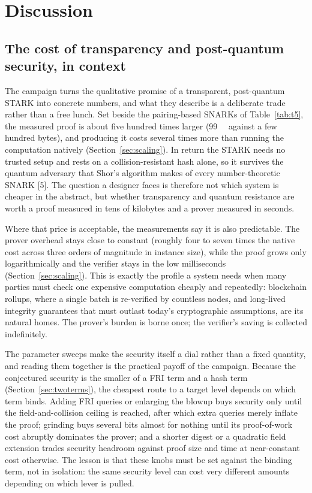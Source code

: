 \documentclass[11pt]{article}
\begin{document}
\section{Discussion}
\label{sec:discussion}

\subsection{The cost of transparency and post-quantum security, in context}
\label{sec:disc-interpret}

The campaign turns the qualitative promise of a transparent, post-quantum STARK into concrete numbers,
and what they describe is a deliberate trade rather than a free lunch. Set beside the pairing-based
SNARKs of Table~\ref{tab:t5}, the measured proof is about five hundred times larger
(\SI{99}{\kibi\byte} against a few hundred bytes), and producing it costs several times more than running
the computation natively (Section~\ref{sec:scaling}). In return the STARK needs no trusted setup and
rests on a collision-resistant hash alone, so it survives the quantum adversary that Shor's algorithm
makes of every number-theoretic SNARK [5]. The question a designer faces is therefore not which system is
cheaper in the abstract, but whether transparency and quantum resistance are worth a proof measured in
tens of kilobytes and a prover measured in seconds.

Where that price is acceptable, the measurements say it is also predictable. The prover overhead stays
close to constant (roughly four to seven times the native cost across three orders of magnitude in
instance size), while the proof grows only logarithmically and the verifier stays in the low
milliseconds (Section~\ref{sec:scaling}). This is exactly the profile a system needs when many parties
must check one expensive computation cheaply and repeatedly: blockchain rollups, where a single batch is
re-verified by countless nodes, and long-lived integrity guarantees that must outlast today's
cryptographic assumptions, are its natural homes. The prover's burden is borne once; the verifier's
saving is collected indefinitely.

The parameter sweeps make the security itself a dial rather than a fixed quantity, and reading them
together is the practical payoff of the campaign. Because the conjectured security is the smaller of a
FRI term and a hash term (Section~\ref{sec:twoterms}), the cheapest route to a target level depends on
which term binds. Adding FRI queries or enlarging the blowup buys security only until the
field-and-collision ceiling is reached, after which extra queries merely inflate the proof; grinding
buys several bits almost for nothing until its proof-of-work cost abruptly dominates the prover; and a
shorter digest or a quadratic field extension trades security headroom against proof size and time at
near-constant cost otherwise. The lesson is that these knobs must be set against the binding term, not in
isolation: the same security level can cost very different amounts depending on which lever is pulled.
\end{document}
